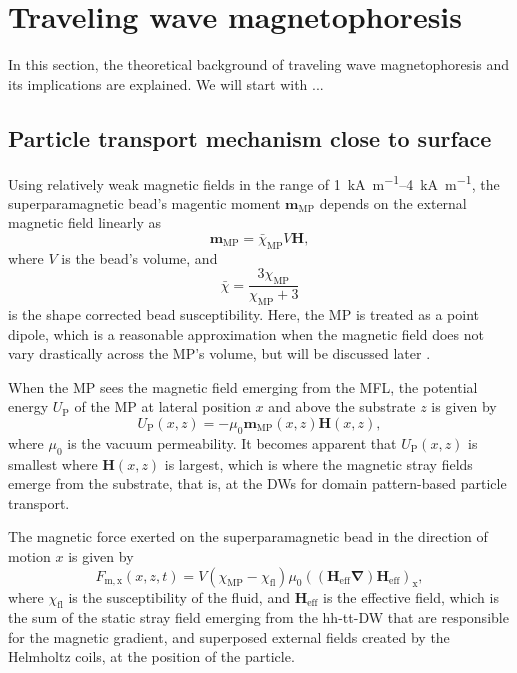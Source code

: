 \section{Traveling wave magnetophoresis}
In this section, the theoretical background of traveling wave magnetophoresis and its implications are explained.
We will start with ...

\subsection{Particle transport mechanism close to surface}
Using relatively weak magnetic fields in the range of \SIrange{1}{4}{\kilo\A\per\m}, the superparamagnetic bead's magentic moment $\mathbf{m_\mathrm{MP}}$ depends on the external magnetic field linearly as 
\begin{equation}\label{eq:m_MP}
    \mathbf{m_\mathrm{MP}} = \bar{\chi}_\mathrm{MP} V \mathbf{H}, 
\end{equation}
where $V$ is the bead's volume, and 
\begin{equation}\label{eq:effective_suceptibility_MP}
    \bar{\chi}=\frac{3\chi_\mathrm{MP}}{\chi_\mathrm{MP} + 3} 
\end{equation}
is the shape corrected bead susceptibility\cite{Yellen2007}.
Here, the \ac{MP} is treated as a point dipole, which is a reasonable approximation when the magnetic field does not vary drastically across the \ac{MP}'s volume, but will be discussed later \cite{Yellen2007}.


When the \ac{MP} sees the magnetic field emerging from the \ac{MFL}, the potential energy $U_\mathrm{P}$ of the \ac{MP} at lateral position $x$ and above the substrate $z$ is given by\cite{Holzinger2015a} 
\begin{equation}\label{eq:U_P_MP}
    U_\mathrm{P}(x,z) = -\mu_0 \mathbf{m_\mathrm{MP}}(x,z) \mathbf{H}(x,z), 
\end{equation}
where $\mu_0$ is the vacuum permeability.
It becomes apparent that $U_\mathrm{P}(x,z)$ is smallest where $\mathbf{H}(x,z)$ is largest, which is where the magnetic stray fields emerge from the substrate, that is, at the \acp{DW} for domain pattern-based particle transport.

The magnetic force exerted on the superparamagnetic bead in the direction of motion $x$ is given by 
\begin{equation}
    F_\mathrm{m,x}(x,z,t)=V(\chi_\mathrm{MP}-\chi_\mathrm{fl}) \mu_0  ((\mathbf{H}_\mathrm{eff} \mathbf{\nabla}) \mathbf{H}_\mathrm{eff})_\mathrm{x},
\end{equation}
where $\chi_\mathrm{fl}$ is the susceptibility of the fluid, and $\mathbf{H}_\mathrm{eff}$ is the effective field, which is the sum of the static stray field emerging from the \ac{hh}-\ac{tt}-\ac{DW} that are responsible for the magnetic gradient, and superposed external fields created by the Helmholtz coils, at the position of the particle\cite{Shubbak2026}.

